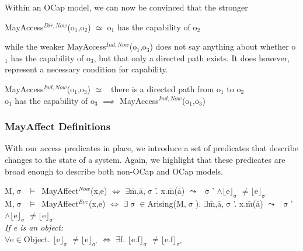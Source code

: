 \documentclass[a4paper,11pt, twoside,twocolumn]{article}
\newenvironment{logic}[1][null]
{\begin{flushleft} \small \label{#1}}
{\end{flushleft}}
\newcommand{\loin}{$\in$}
\newcommand{\loforall}{$\forall$}
\newcommand{\loexists}{$\exists$}
\newcommand{\loand}{$\land$}
\newcommand{\loneq} {$\neq$}
\newcommand{\losimeq} {$\simeq$}
\newcommand{\loimplies}{$\implies$}
\newcommand{\losigma}{$\upsigma$}
\newcommand{\loturns} {$\vDash$}
\newcommand{\loiff} {$\iff$}
\newcommand{\loleadsto} {$\leadsto$}
\newcommand{\loexec}[2] {$\lfloor$#1$\rfloor _{\text{#2}}$}
\newcommand{\loconj}[1] {$\bar{\text{#1}}$}
\newcommand{\ablock} {\null\qquad}
\begin{document}
Within an OCap model, we can now be convinced that the stronger
\begin{logic}
MayAccess$^{Dir,Now}$(o$_1$,o$_2$) \losimeq \linebreak
\ablock o$_1$ has the capability of o$_2$\end{logic}
while the weaker MayAccess$^{Ind,Now}$(o$_1$,o$_3$) does not say anything about whether o$_1$ has the capability of o$_3$, but that only a directed path exists. It does however, represent a necessary condition for capability.
\begin{logic}
MayAccess$^{Ind,Now}$(o$_1$,o$_3$) \losimeq\ \linebreak
\ablock there is a directed path from o$_1$ to o$_2$\linebreak
\\
o$_1$ has the capability of o$_3$ \loimplies \linebreak
\ablock MayAccess$^{Ind,Now}$(o$_1$,o$_3$)\end{logic}
\subsubsection{MayAffect Definitions}
With our access predicates in place, we introduce a set of predicates that describe changes to the state of a system. Again, we highlight that these predicates are broad enough to describe both non-OCap and OCap models. 
\begin{logic}
M,\losigma\ \loturns\ MayAffect$^{Now}$(x,e) \loiff \linebreak
\ablock \loexists \loconj{m},\loconj{a},\losigma'. x.\loconj{m}(\loconj{a}) \loleadsto\ \losigma' \loand \loexec{e}{\losigma} \loneq \loexec{e}{\losigma'}
\linebreak \\
M,\losigma\ \loturns\ MayAffect$^{Eve}$(x,e) \loiff \linebreak
\ablock \loexists \losigma \loin Arising(M,\losigma).\linebreak
\ablock \loexists \loconj{m},\loconj{a},\losigma'. x.\loconj{m}(\loconj{a}) \loleadsto\ \losigma' \loand \loexec{e}{\losigma} \loneq \loexec{e}{\losigma'}
\linebreak \\
\textit{If e is an object:} \\
\loforall e\loin Object. \loexec{e}{\losigma} \loneq \loexec{e}{\losigma'} \loiff \linebreak
\ablock \loexists f. \loexec{e.f}{\losigma} \loneq \loexec{e.f}{\losigma'}
\end{logic}
\end{document}

